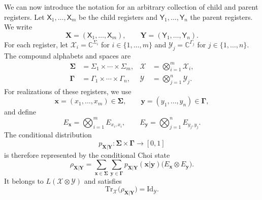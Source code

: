 \documentclass[
    aps,
    pra,
    reprint,
    superscriptaddress,
    nofootinbib
]{revtex4-2}
\theoremstyle{definition}
\theoremstyle{plain}
\begin{document}
We can now introduce the notation for an arbitrary collection of child and
parent registers. Let
$\mathsf{X}_{1},\dots,\mathsf{X}_{m}$ be the child registers and
$\mathsf{Y}_{1},\dots,\mathsf{Y}_{n}$ the parent registers. We write
\begin{equation}
    \mathbf{X}=(\mathsf{X}_{1},\dots,\mathsf{X}_{m}),
    \qquad
    \mathbf{Y}=(\mathsf{Y}_{1},\dots,\mathsf{Y}_{n}).
\end{equation}
For each register, let
$\mathcal{X}_{i}=\mathbb{C}^{\Sigma_{i}}$ for
$i\in\{1,\dots,m\}$ and
$\mathcal{Y}_{j}=\mathbb{C}^{\Gamma_{j}}$ for
$j\in\{1,\dots,n\}$. The compound alphabets and spaces are
\begin{align}
    \boldsymbol{\Sigma}
    &=
    \Sigma_{1}\times\cdots\times\Sigma_{m},
    &
    \mathcal{X}
    &=
    \bigotimes_{i=1}^{m}\mathcal{X}_{i},\\
    \boldsymbol{\Gamma}
    &=
    \Gamma_{1}\times\cdots\times\Gamma_{n},
    &
    \mathcal{Y}
    &=
    \bigotimes_{j=1}^{n}\mathcal{Y}_{j}.
\end{align}
For realizations of these registers, we use
\begin{equation}
    \mathbf{x}=(x_{1},\dots,x_{m})
    \in\boldsymbol{\Sigma},
    \qquad
    \mathbf{y}=(y_{1},\dots,y_{n})
    \in\boldsymbol{\Gamma},
\end{equation}
and define
\begin{equation}
    E_{\mathbf{x}}
    =
    \bigotimes_{i=1}^{m}E_{x_{i},x_{i}},
    \qquad
    E_{\mathbf{y}}
    =
    \bigotimes_{j=1}^{n}E_{y_{j},y_{j}}.
\end{equation}
The conditional distribution
\begin{equation}
    p_{\mathbf{X}|\mathbf{Y}}:
    \boldsymbol{\Sigma}\times\boldsymbol{\Gamma}
    \to[0,1]
\end{equation}
is therefore represented by the conditional Choi state
\begin{equation}
    \rho_{\mathbf{X}|\mathbf{Y}}
    =
    \sum_{\mathbf{x}\in\boldsymbol{\Sigma}}
    \sum_{\mathbf{y}\in\boldsymbol{\Gamma}}
    p_{\mathbf{X}|\mathbf{Y}}(\mathbf{x}|\mathbf{y})
    \bigl(E_{\mathbf{x}}\otimes E_{\mathbf{y}}\bigr).
\end{equation}
It belongs to $L(\mathcal{X}\otimes\mathcal{Y})$ and satisfies
\begin{equation}
    \mathrm{Tr}_{\mathcal{X}}
    \bigl(\rho_{\mathbf{X}|\mathbf{Y}}\bigr)
    =
    \mathrm{Id}_{\mathcal{Y}}.
\end{equation}
\end{document}
